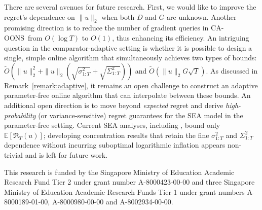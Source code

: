 \documentclass{article}
\renewcommand{\citet}{\citep}
\theoremstyle{plain}
\theoremstyle{definition}
\theoremstyle{remark}
\renewcommand{\Bbb}{\mathbb}
\newcommand{\E}{{\Bbb E}}
\newcommand{\cawe}{{\sc CA-OONS}}
\newcommand{\regret}{\mathfrak{R}}
\renewcommand{\tilde}{\widetilde}
\begin{document}
There are several avenues for future research. First, we would like to  improve the regret's dependence on   $\| u \|_2$    when both  $D$  and  $G$  are unknown. %
Another promising direction is to reduce the number of gradient queries in \cawe\ from  $O(\log T)$  to  $O(1)$,  thus enhancing its efficiency. An intriguing question in the comparator-adaptive setting is whether it is possible to design a single, simple online algorithm that simultaneously achieves two types of bounds: $\tilde{O}(\|u\|_2^2 + \|u\|_2(\sqrt{\sigma^2_{1:T}} + \sqrt{\Sigma^2_{1:T}}))$ and $\tilde{O}(\|u\|_2 G \sqrt{T})$. As discussed in Remark~\ref{remark:adaptive}, it remains an open challenge to construct an adaptive parameter-free online algorithm that can interpolate between these bounds. %
An additional open direction is to move beyond \emph{expected} regret and derive \emph{high-probability} (or variance-sensitive) regret guarantees for the SEA model in the parameter-free setting. Current SEA analyses, including \citet{sachs2023accelerated,chen2024optimistic}, bound only $\E[\regret_T(u)]$; developing concentration results that retain the fine $\sigma_{1:T}^2$ and $\Sigma_{1:T}^2$ dependence without incurring suboptimal logarithmic inflation appears non-trivial and is left for future work.

\begin{ack}
This research is funded by the Singapore Ministry of Education
Academic Research Fund Tier 2 under grant number A-8000423-00-00 and
three Singapore Ministry of Education Academic Research Funds Tier 1 under
grant numbers A-8000189-01-00, A-8000980-00-00 and A-8002934-00-00.
\end{ack}


\newpage


\end{document}
